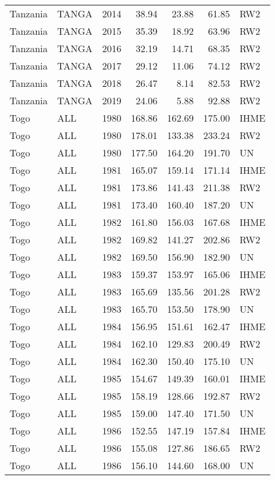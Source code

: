 \begin{longtable}{lllrrrl}
  Tanzania & TANGA & 2014 & 38.94 & 23.88 & 61.85 & RW2 \\ 
  Tanzania & TANGA & 2015 & 35.39 & 18.92 & 63.96 & RW2 \\ 
  Tanzania & TANGA & 2016 & 32.19 & 14.71 & 68.35 & RW2 \\ 
  Tanzania & TANGA & 2017 & 29.12 & 11.06 & 74.12 & RW2 \\ 
  Tanzania & TANGA & 2018 & 26.47 & 8.14 & 82.53 & RW2 \\ 
  Tanzania & TANGA & 2019 & 24.06 & 5.88 & 92.88 & RW2 \\ 
  Togo & ALL & 1980 & 168.86 & 162.69 & 175.00 & IHME \\ 
  Togo & ALL & 1980 & 178.01 & 133.38 & 233.24 & RW2 \\ 
  Togo & ALL & 1980 & 177.50 & 164.20 & 191.70 & UN \\ 
  Togo & ALL & 1981 & 165.07 & 159.14 & 171.14 & IHME \\ 
  Togo & ALL & 1981 & 173.86 & 141.43 & 211.38 & RW2 \\ 
  Togo & ALL & 1981 & 173.40 & 160.40 & 187.20 & UN \\ 
  Togo & ALL & 1982 & 161.80 & 156.03 & 167.68 & IHME \\ 
  Togo & ALL & 1982 & 169.82 & 141.27 & 202.86 & RW2 \\ 
  Togo & ALL & 1982 & 169.50 & 156.90 & 182.90 & UN \\ 
  Togo & ALL & 1983 & 159.37 & 153.97 & 165.06 & IHME \\ 
  Togo & ALL & 1983 & 165.69 & 135.56 & 201.28 & RW2 \\ 
  Togo & ALL & 1983 & 165.70 & 153.50 & 178.90 & UN \\ 
  Togo & ALL & 1984 & 156.95 & 151.61 & 162.47 & IHME \\ 
  Togo & ALL & 1984 & 162.10 & 129.83 & 200.49 & RW2 \\ 
  Togo & ALL & 1984 & 162.30 & 150.40 & 175.10 & UN \\ 
  Togo & ALL & 1985 & 154.67 & 149.39 & 160.01 & IHME \\ 
  Togo & ALL & 1985 & 158.19 & 128.66 & 192.87 & RW2 \\ 
  Togo & ALL & 1985 & 159.00 & 147.40 & 171.50 & UN \\ 
  Togo & ALL & 1986 & 152.55 & 147.19 & 157.84 & IHME \\ 
  Togo & ALL & 1986 & 155.08 & 127.86 & 186.65 & RW2 \\ 
  Togo & ALL & 1986 & 156.10 & 144.60 & 168.00 & UN \\ 

\end{longtable}
